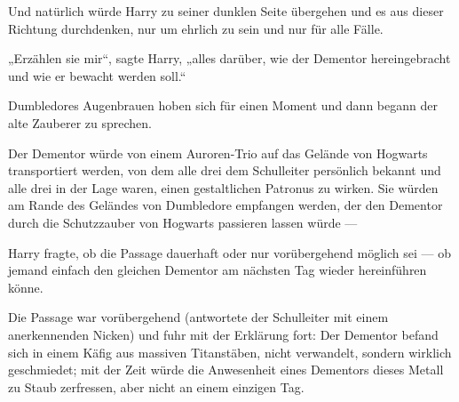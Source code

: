 Und natürlich würde Harry zu seiner dunklen Seite übergehen und es aus dieser Richtung durchdenken, nur um ehrlich zu sein und nur für alle Fälle.

„Erzählen sie mir“, sagte Harry, „alles darüber, wie der Dementor hereingebracht und wie er bewacht werden soll.“

Dumbledores Augenbrauen hoben sich für einen Moment und dann begann der alte Zauberer zu sprechen.

Der Dementor würde von einem Auroren-Trio auf das Gelände von Hogwarts transportiert werden, von dem alle drei dem Schulleiter persönlich bekannt und alle drei in der Lage waren, einen gestaltlichen Patronus zu wirken. Sie würden am Rande des Geländes von Dumbledore empfangen werden, der den Dementor durch die Schutzzauber von Hogwarts passieren lassen würde —

Harry fragte, ob die Passage dauerhaft oder nur vorübergehend möglich sei — ob jemand einfach den gleichen Dementor am nächsten Tag wieder hereinführen könne.

Die Passage war vorübergehend (antwortete der Schulleiter mit einem anerkennenden Nicken) und fuhr mit der Erklärung fort: Der Dementor befand sich in einem Käfig aus massiven Titanstäben, nicht verwandelt, sondern wirklich geschmiedet; mit der Zeit würde die Anwesenheit eines Dementors dieses Metall zu Staub zerfressen, aber nicht an einem einzigen Tag.

